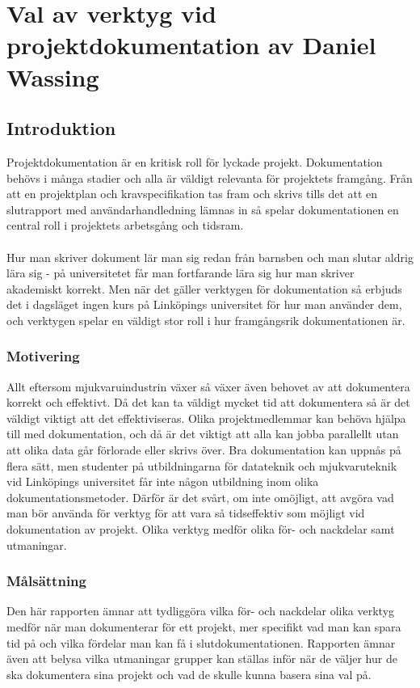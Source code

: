 \chapter{Val av verktyg vid projektdokumentation av Daniel Wassing}
\section{Introduktion}
\label{cha:wassing-introduction}
Projektdokumentation är en kritisk roll för lyckade projekt. Dokumentation behövs i många stadier och alla är väldigt relevanta för projektets framgång. Från att en projektplan och kravspecifikation tas fram och skrivs tills det att en slutrapport med användarhandledning lämnas in så spelar dokumentationen en central roll i projektets arbetsgång och tidsram. 
\\ \\
Hur man skriver dokument lär man sig redan från barnsben och man slutar aldrig lära sig - på universitetet får man fortfarande lära sig hur man skriver akademiskt korrekt. Men när det gäller verktygen för dokumentation så erbjuds det i dagsläget ingen kurs på Linköpings universitet för hur man använder dem, och verktygen spelar en väldigt stor roll i hur framgångsrik dokumentationen är.

\subsection{Motivering}
\label{sec:wassing-motivation}
Allt eftersom mjukvaruindustrin växer så växer även behovet av att dokumentera korrekt och effektivt. Då det kan ta väldigt mycket tid att dokumentera så är det väldigt viktigt att det effektiviseras. Olika projektmedlemmar kan behöva hjälpa till med dokumentation, och då är det viktigt att alla kan jobba parallellt utan att olika data går förlorade eller skrivs över. Bra dokumentation kan uppnås på flera sätt, men studenter på utbildningarna för datateknik och mjukvaruteknik vid Linköpings universitet får inte någon utbildning inom olika dokumentationsmetoder. Därför är det svårt, om inte omöjligt, att avgöra vad man bör använda för verktyg för att vara så tidseffektiv som möjligt vid dokumentation av projekt. Olika verktyg medför olika för- och nackdelar samt utmaningar.

\subsection{Målsättning}
\label{sec:wassing-aim}
Den här rapporten ämnar att tydliggöra vilka för- och nackdelar olika verktyg medför när man dokumenterar för ett projekt, mer specifikt vad man kan spara tid på och vilka fördelar man kan få i slutdokumentationen. Rapporten ämnar även att belysa vilka utmaningar grupper kan ställas inför när de väljer hur de ska dokumentera sina projekt och vad de skulle kunna basera sina val på.

